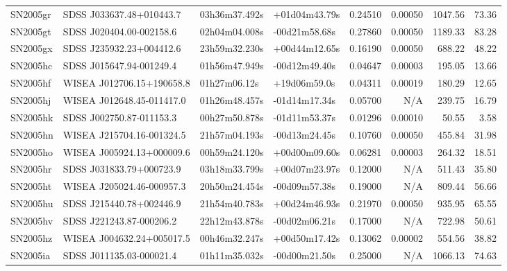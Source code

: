\begin{longtable}{llllrrrr}
SN2005gr         &        SDSS J033637.48+010443.7 &   03h36m37.492s &   +01d04m43.79s &  0.24510 &  0.00050 &  1047.56 &       73.36 \\
SN2005gt         &        SDSS J020404.00-002158.6 &   02h04m04.008s &   -00d21m58.68s &  0.27860 &  0.00050 &  1189.33 &       83.28 \\
SN2005gx         &        SDSS J235932.23+004412.6 &   23h59m32.230s &   +00d44m12.65s &  0.16190 &  0.00050 &   688.22 &       48.22 \\
SN2005hc         &        SDSS J015647.94-001249.4 &   01h56m47.949s &   -00d12m49.40s &  0.04647 &  0.00003 &   195.05 &       13.66 \\
SN2005hf         &       WISEA J012706.15+190658.8 &    01h27m06.12s &    +19d06m59.0s &  0.04311 &  0.00019 &   180.29 &       12.65 \\
SN2005hj         &       WISEA J012648.45-011417.0 &   01h26m48.457s &   -01d14m17.34s &  0.05700 &      N/A &   239.75 &       16.79 \\
SN2005hk         &        SDSS J002750.87-011153.3 &   00h27m50.878s &   -01d11m53.37s &  0.01296 &  0.00010 &    50.55 &        3.58 \\
SN2005hn         &       WISEA J215704.16-001324.5 &   21h57m04.193s &   -00d13m24.45s &  0.10760 &  0.00050 &   455.84 &       31.98 \\
SN2005ho         &       WISEA J005924.13+000009.6 &   00h59m24.120s &   +00d00m09.60s &  0.06281 &  0.00003 &   264.32 &       18.51 \\
SN2005hr         &        SDSS J031833.79+000723.9 &   03h18m33.799s &   +00d07m23.97s &  0.12000 &      N/A &   511.43 &       35.80 \\
SN2005ht         &       WISEA J205024.46-000957.3 &   20h50m24.454s &   -00d09m57.38s &  0.19000 &      N/A &   809.44 &       56.66 \\
SN2005hu         &        SDSS J215440.78+002446.9 &   21h54m40.783s &   +00d24m46.93s &  0.21970 &  0.00050 &   935.95 &       65.55 \\
SN2005hv         &        SDSS J221243.87-000206.2 &   22h12m43.878s &   -00d02m06.21s &  0.17000 &      N/A &   722.98 &       50.61 \\
SN2005hz         &       WISEA J004632.24+005017.5 &   00h46m32.247s &   +00d50m17.42s &  0.13062 &  0.00002 &   554.56 &       38.82 \\
SN2005ia         &        SDSS J011135.03-000021.4 &   01h11m35.032s &   -00d00m21.50s &  0.25000 &      N/A &  1066.13 &       74.63 \\

\end{longtable}
